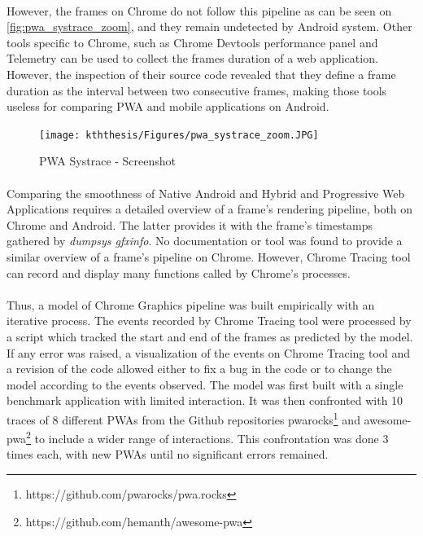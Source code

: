 \documentclass{kththesis}
\begin{document}
    \paragraph{}
    However, the frames on Chrome do not follow this pipeline as can be seen on \autoref{fig:pwa_systrace_zoom}, and they remain undetected by Android system. Other tools specific to Chrome, such as Chrome Devtools performance panel and Telemetry can be used to collect the frames duration of a web application. However, the inspection of their source code revealed that they define a frame duration as the interval between two consecutive frames, making those tools useless for comparing PWA and mobile applications on Android.
    
    \begin{figure}
        \centering
        \texttt{[image: kththesis/Figures/pwa\_systrace\_zoom.JPG]}
        \caption{PWA Systrace - Screenshot}
        \label{fig:pwa_systrace_zoom}
    \end{figure}
    
    \paragraph{}
    Comparing the smoothness of Native Android and Hybrid and Progressive Web Applications requires a detailed overview of a frame's rendering pipeline, both on Chrome and Android. The latter provides it with the frame's timestamps gathered by \textit{dumpsys gfxinfo}. No documentation or tool was found to provide a similar overview of a frame's pipeline on Chrome. However, Chrome Tracing tool can record and display many functions called by Chrome's processes.
    
    \paragraph{}
    Thus, a model of Chrome Graphics pipeline was built empirically with an iterative process. The events recorded by Chrome Tracing tool were processed by a script which tracked the start and end of the frames as predicted by the model. If any error was raised, a visualization of the events on Chrome Tracing tool and a revision of the code allowed either to fix a bug in the code or to change the model according to the events observed. \newline
    The model was first built with a single benchmark application with limited interaction. It was then confronted with 10 traces of 8 different PWAs from the Github repositories pwarocks\footnote{https://github.com/pwarocks/pwa.rocks} and awesome-pwa\footnote{https://github.com/hemanth/awesome-pwa} to include a wider range of interactions. This confrontation was done 3 times each, with new PWAs until no significant errors remained.
    
\end{document}
